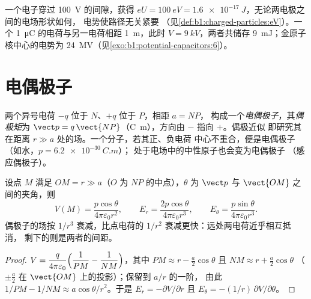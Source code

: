 \begin{example}[电子伏特（再谈）]\label{ex:b1:potential-capacitors:eV}
一个电子穿过 \qty{100}{V} 的间隙，获得 $eU = \qty{100}{eV} =
\qty{1.6e-17}{J}$，无论两电极之间的电场形状如何，
电势使路径无关紧要
（见\cref{def:b1:charged-particles:eV}）。一个 \qty{1}{\micro C} 的电荷与另一电荷相距
\qty{1}{m}，此时 $V = \qty{9}{kV}$，两者共储存
\qty{9}{mJ}；金原子核中心的电势为
\qty{24}{MV}（见\cref{exo:b1:potential-capacitors:6}）。
\end{example}

\section{电偶极子}

\begin{definition}[电偶极子]\label{def:b1:potential-capacitors:dipole}
两个异号电荷 $-q$ 位于 $N$、$+q$ 位于 $P$，相距 $a = NP$，
构成一个\emph{电偶极子}，其\emph{偶极矩}为
$\vect p = q\,\vect{NP}$（\unit{C.m}），方向由 $-$ 指向 $+$。偶极近似
即研究其在距离 $r \gg a$ 处的场。一个分子，若其正、负电荷
中心不重合，便是电偶极子（如水，$p = \qty{6.2e-30}{C.m}$）；
处于电场中的中性原子也会变为电偶极子
（感应偶极子）。
\end{definition}

\begin{proposition}[电偶极子的场]\label{prop:b1:potential-capacitors:dipolefield}
设点 $M$ 满足 $OM = r \gg a$（$O$ 为 $NP$ 的中点），$\theta$ 为
$\vect p$ 与 $\vect{OM}$ 之间的夹角，则
\[
V(M) = \frac{p\cos\theta}{4\pi\varepsilon_0 r^2}, \qquad
E_r = \frac{2p\cos\theta}{4\pi\varepsilon_0r^3}, \qquad
E_\theta = \frac{p\sin\theta}{4\pi\varepsilon_0r^3} .
\]
偶极子的场按 $1/r^3$ 衰减，比点电荷的 $1/r^2$
衰减更快：远处两电荷近乎相互抵消，
剩下的则是两者的间距。
\end{proposition}

\begin{proof}
$V = \dfrac{q}{4\pi\varepsilon_0}\Bigl(\dfrac1{PM} - \dfrac1{NM}\Bigr)$，其中
$PM \approx r - \tfrac a2\cos\theta$ 且 $NM \approx r + \tfrac a2\cos\theta$
（$\pm\tfrac a2$ 在 $\vect{OM}$ 上的投影）；保留到 $a/r$ 的一阶，
由此 $1/PM - 1/NM \approx a\cos\theta/r^2$。于是 $E_r = -\partial V/\partial r$ 且
$E_\theta = -(1/r)\,\partial V/\partial\theta$。
\end{proof}

